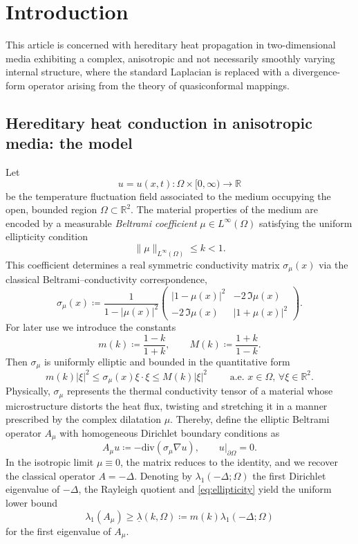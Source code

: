 \documentclass[12pt,leqno]{amsart}
\def\R {\mathbb{R}}
\theoremstyle{definition}
\numberwithin{equation}{section}
\numberwithin{figure}{section}
\begin{document}
\section{Introduction}


\label{sec:main}

This article is concerned with hereditary heat propagation in two-dimensional media exhibiting a complex, anisotropic and not necessarily smoothly varying internal structure, where  the standard Laplacian is replaced   with a divergence-form operator arising from the theory of quasiconformal mappings. 


 
\subsection{Hereditary heat conduction in anisotropic media: the model}


Let \[
u=u(x,t): \Omega \times [0,\infty) \to \mathbb R\] be the temperature fluctuation field associated to the medium occupying the open, bounded region $\Omega \subset \R^2$.
The material properties of the medium are encoded by a measurable \emph{Beltrami coefficient}
$\mu\in L^\infty(\Omega)$ satisfying the uniform ellipticity condition
\[
\|\mu\|_{L^\infty(\Omega)}\le k<1.
\]
This coefficient determines a  real symmetric conductivity matrix $\sigma_\mu(x)$ via the classical
Beltrami--conductivity correspondence,
\begin{equation}\label{eq:ellipticitymat}
\sigma_\mu(x) \coloneqq \frac{1}{1-|\mu(x)|^2}
\begin{pmatrix}
|1-\mu(x)|^2 & -2\,\Im\mu(x) \\[2mm]
-2\,\Im\mu(x) & |1+\mu(x)|^2
\end{pmatrix}.
\end{equation}
For later use we introduce the constants
\[
m(k)\coloneqq\frac{1-k}{1+k},\qquad M(k)\coloneqq\frac{1+k}{1-k}.
\]
Then $\sigma_\mu$ is uniformly elliptic and bounded in the quantitative form
\begin{equation}\label{eq:ellipticity}
m(k)|\xi|^{2}\le \sigma_\mu(x)\xi\cdot\xi\le M(k)|\xi|^{2}
\qquad\text{ a.e. }x\in\Omega,\, \forall \xi\in\mathbb R^{2}.
\end{equation}
Physically, $\sigma_\mu$ represents the thermal conductivity tensor of a material whose microstructure
distorts the heat flux, twisting and stretching it in a manner prescribed by the complex dilatation $\mu$.
Thereby, define the elliptic Beltrami operator $A_\mu$ with homogeneous Dirichlet boundary conditions as
\[
A_\mu u \coloneqq -  \mathrm{div}(\sigma_\mu \nabla u), \qquad u|_{\partial \Omega}=0.
\]
In the isotropic limit $\mu \equiv 0$, the matrix reduces to the identity, and we recover the classical
operator $A=-\Delta$. Denoting by $\lambda_1(-\Delta;\Omega)$ the first Dirichlet eigenvalue of $-\Delta$,
the Rayleigh quotient and \eqref{eq:ellipticity} yield the uniform lower bound
\begin{equation}
	\label{e:lbeigen}
\lambda_1(A_\mu)\ge \underline{\lambda}(k,\Omega) \coloneqq m(k)\lambda_1(-\Delta;\Omega) 
\end{equation}
for the first eigenvalue of $A_\mu$.
\end{document}
